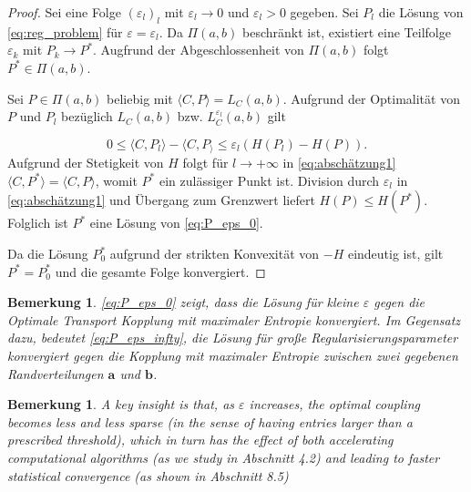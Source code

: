 \documentclass[11pt,a4paper]{article}
\newtheorem{remark}[theorem]{Bemerkung}
\numberwithin{equation}{section}
\begin{document}
	\begin{proof}
		Sei eine Folge $(\varepsilon_l)_l$ mit $\varepsilon_l \to 0$ und $\varepsilon_l > 0$ gegeben. Sei $P_l$ die Lösung von  \autoref{eq:reg_problem} für $\varepsilon = \varepsilon_l$. Da $\Pi(a,b)$ beschränkt ist, existiert eine Teilfolge $\varepsilon_k$ mit $P_k \to P^*$. Augfrund der Abgeschlossenheit von $\Pi(a,b)$ folgt $P^* \in \Pi(a,b)$.
		
		Sei $P \in \Pi (a,b)$ beliebig mit $\langle C, P \rangle = L_C(a,b)$. Aufgrund der Optimalität von $P$ und $P_l$ bezüglich $L_C(a,b)$ bzw. $L_C^{\varepsilon_l}(a,b)$ gilt
		
		\begin{equation}
		0 \leq \langle C, P_l\rangle - \langle C, P_\rangle \leq \varepsilon_l (H(P_l)-H(P)). \label{eq:abschätzung1}
		\end{equation}
		Aufgrund der Stetigkeit von $H$ folgt für $l \to +\infty$ in \autoref{eq:abschätzung1} $\langle C, P^* \rangle = \langle C, P \rangle$, womit $P^*$ ein zulässiger Punkt ist. Division durch $\varepsilon_l$ in \autoref{eq:abschätzung1} und Übergang zum Grenzwert liefert $H(P)\leq H(P^*)$. Folglich ist $P^*$ eine Lösung von \autoref{eq:P_eps_0}.
		
		Da die Lösung $P_0^*$ aufgrund der strikten Konvexität von $-H$ eindeutig ist, gilt $P^* = P_0^*$ und die gesamte Folge konvergiert.
		
		
	\end{proof}
	
	\begin{remark}
		\autoref{eq:P_eps_0} zeigt, dass die Lösung für kleine $\varepsilon$ gegen die Optimale Transport Kopplung mit maximaler Entropie konvergiert. Im Gegensatz dazu, bedeutet \autoref{eq:P_eps_infty}, die Lösung für große Regularisierungsparameter konvergiert gegen die Kopplung mit maximaler Entropie zwischen zwei gegebenen Randverteilungen $\boldsymbol{a}$ und $\boldsymbol{b}$.\\
		
	\end{remark}
	
	\begin{remark}
		A key insight is that, as $\varepsilon$ increases, the optimal coupling
		becomes less and less sparse (in the sense of having entries larger than a prescribed
		threshold), which in turn has the effect of both accelerating computational algorithms
		(as we study in Abschnitt 4.2) and leading to faster statistical convergence (as shown in Abschnitt 8.5)
	\end{remark}
	
\end{document}
